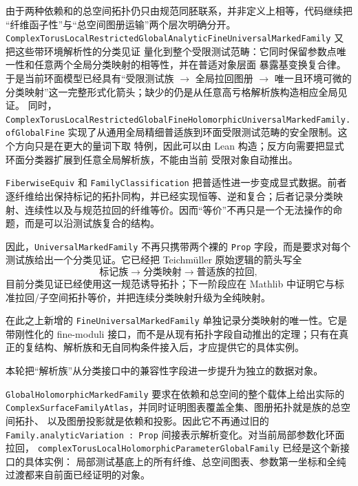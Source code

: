 \documentclass[UTF8,fontset=none,a4paper,11pt]{ctexart}
\begin{document}
\begin{sloppypar}
由于两种依赖和的总空间拓扑仍只由规范同胚联系，并非定义上相等，代码继续把
“纤维函子性”与“总空间图册运输”两个层次明确分开。
\texttt{ComplexTorusLocalRestrictedGlobalAnalyticFineUniversalMarkedFamily} 又把这些带环境解析性的分类见证
量化到整个受限测试范畴：它同时保留参数点唯一性和任意两个全局分类映射的相等性，并在普适对象层面
暴露基变换复合律。于是当前环面模型已经具有“受限测试族 $\to$ 全局拉回图册 $\to$ 唯一且环境可微的
分类映射”这一完整形式化箭头；缺少的仍是从任意高亏格解析族构造相应全局见证。
同时，\texttt{ComplexTorusLocalRestrictedGlobalFine}\linebreak[3]
\texttt{HolomorphicUniversalMarkedFamily.ofGlobalFine}
实现了从通用全局精细普适族到环面受限测试范畴的安全限制。这个方向只是在更大的量词下取
特例，因此可以由 Lean 构造；反方向需要把显式环面分类器扩展到任意全局解析族，不能由当前
受限对象自动推出。
\end{sloppypar}


\texttt{FiberwiseEquiv} 和 \texttt{FamilyClassification} 把普适性进一步变成显式数据。前者逐纤维给出保持标记的拓扑同构，并已经实现恒等、逆和复合；后者记录分类映射、连续性以及与规范拉回的纤维等价。因而“等价”不再只是一个无法操作的命题，而是可以沿测试族复合的结构。

因此，\texttt{UniversalMarkedFamily} 不再只携带两个裸的 \texttt{Prop} 字段，而是要求对每个测试族给出一个分类见证。它已经把 Teichmüller 原始逻辑的箭头写全
\[
  \text{标记族}\longrightarrow\text{分类映射}\longrightarrow\text{普适族的拉回},
\]
目前分类见证已经使用这一规范诱导拓扑；下一阶段应在 Mathlib 中证明它与标准拉回/子空间拓扑等价，并把连续分类映射升级为全纯映射。

在此之上新增的 \texttt{FineUniversalMarkedFamily} 单独记录分类映射的唯一性。它是带刚性化的 fine-moduli 接口，而不是从现有拓扑字段自动推出的定理；只有在真正的复结构、解析族和无自同构条件接入后，才应提供它的具体实例。

本轮把“解析族”从分类接口中的兼容性字段进一步提升为独立的数据对象。
\par
\texttt{Global\allowbreak Holomorphic\allowbreak Marked\allowbreak Family} 要求在依赖和总空间的整个载体上给出实际的
\texttt{ComplexSurfaceFamily\allowbreak Atlas}，并同时证明图表覆盖全集、图册拓扑就是族的总空间拓扑、
以及图册投影就是依赖和投影。因此它不再通过旧的
\texttt{Family.analyticVariation : Prop} 间接表示解析变化。对当前局部参数化环面拉回，
\texttt{complexTorusLocalHolomorphicParameter\allowbreak Global\allowbreak Family} 已经是这个新接口的具体实例：
局部测试基底上的所有纤维、总空间图表、参数第一坐标和全纯过渡都来自前面已经证明的对象。
\end{document}
